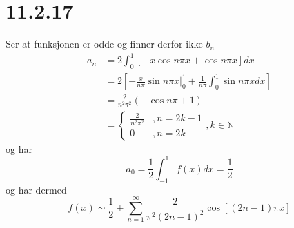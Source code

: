 \documentclass{report}
\newcommand{\M}[2]{\mathbb{#1}^{#2}}
\newcommand{\nbrack}[1]{\left( #1 \right)}
\newcommand{\bbrack}[1]{\left[ #1 \right]}
\begin{document}
\section*{11.2.17}
Ser at funksjonen er odde og finner derfor ikke $b_{n}$
\begin{equation}
  \label{eq:16}
  \begin{split}
    a_{n} &= 2 \int_{0}^{1} \bbrack{ -x \cos n\pi x + \cos n\pi x } dx \\
          &= 2\bbrack{ -\frac{x}{n\pi} \sin n\pi x \Big|_{0}^{1} + \frac{1}{n\pi} \int_{0}^{1} \sin n\pi x dx } \\
          &= \frac{2}{n^{2}\pi^{2}} \nbrack{ -\cos n\pi + 1 } \\
    &= \left\lbrace
      \begin{array}{ll}
        \frac{2}{n^{2}\pi^{2}} & , n = 2k-1 \\
        0 & , n = 2k
      \end{array} \right. , k\in \M{N}{}
  \end{split}
\end{equation}
og har
\begin{equation}
  \label{eq:17}
  a_{0} = \frac{1}{2} \int_{-1}^{1} f(x) dx = \frac{1}{2}
\end{equation}
og har dermed
\begin{equation}
  \label{eq:18}
  f(x) \sim \frac{1}{2} + \sum_{n=1}^{\infty} \frac{2}{\pi^{2} \nbrack{2n-1}^{2}} \cos \bbrack{ \nbrack{2n-1} \pi x }
\end{equation}
\end{document}
